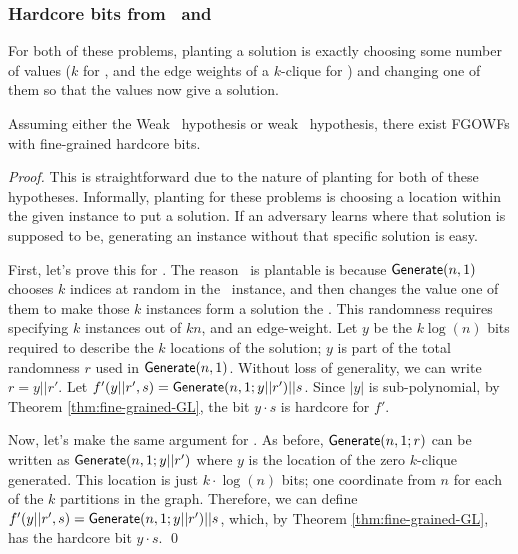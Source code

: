 \subsubsection{Hardcore bits from \kSum~and \zkclique}
For both of these problems, planting a solution is exactly choosing some number of values ($k$ for \kSum, and the edge weights of a $k$-clique for \zkclique) and  changing one of them so that the values now give a solution.

\begin{corollary}
	Assuming either the Weak \kSum~hypothesis or weak \zkclique~hypothesis, there exist FGOWFs with fine-grained hardcore bits.
	\label{cor:hardcorebitkclique}
\end{corollary}
\begin{proof}
	This is straightforward due to the nature of planting for both of these hypotheses. Informally, planting for these problems is choosing a location within the given instance to put a solution. If an adversary learns where that solution is supposed to be, generating an instance without that specific solution is easy.
	
	First, let's prove this for \kSum. The reason \kSum~is plantable is because $\mathsf{Generate}(n,1)$ chooses $k$ indices at random in the \kSum~instance, and then changes the value one of them to make those $k$ instances form a solution the \kSum. This randomness requires specifying $k$ instances out of $kn$, and an edge-weight. Let $y$ be the $k\log(n)$ bits required to describe the $k$ locations of the solution; $y$ is part of the total randomness $r$ used in $\mathsf{Generate}(n,1)$. Without loss of generality, we can write $r = y||r'$. Let $f'(y||r', s) = \mathsf{Generate}(n,1; y||r')|| s$. Since $|y|$ is sub-polynomial, by Theorem \ref{thm:fine-grained-GL}, the bit $y \cdot s$ is hardcore for $f'$.
	
	Now, let's make the same argument for \zkclique. As before, $\mathsf{Generate}(n,1;r)$ can be written as $\mathsf{Generate}(n,1;y||r')$ where $y$ is the location of the zero $k$-clique generated. This location is just $k \cdot \log(n)$ bits; one coordinate from $n$ for each of the $k$ partitions in the graph. Therefore, we can define $f'(y||r', s) = \mathsf{Generate}(n,1;y||r') || s$, which, by Theorem \ref{thm:fine-grained-GL}, has the hardcore bit $y \cdot s$.
	\qed
\end{proof}

